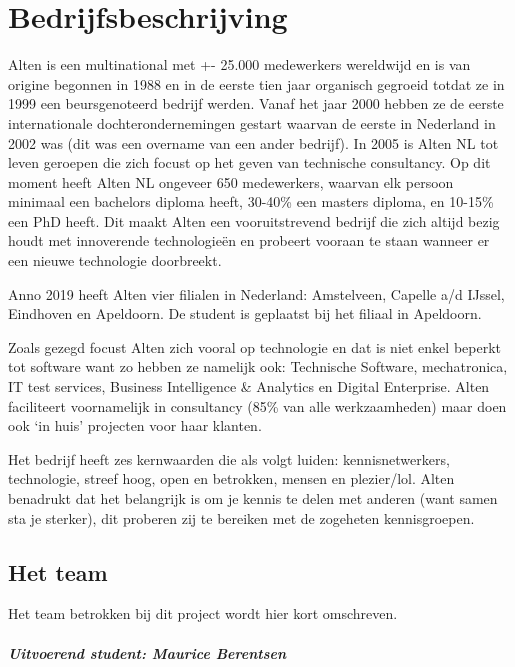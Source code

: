 \documentclass[a4paper, 11pt, oneside]{report}
\begin{document}
\chapter{Bedrijfsbeschrijving}\label{sec:bedrijfsbeschrijving}

Alten is een multinational met +- 25.000 medewerkers wereldwijd en is van origine begonnen in 1988 en in de eerste tien jaar organisch gegroeid totdat ze in 1999 een beursgenoteerd bedrijf werden.
Vanaf het jaar 2000 hebben ze de eerste internationale dochterondernemingen gestart waarvan de eerste in Nederland in 2002 was (dit was een overname van een ander bedrijf).
In 2005 is Alten NL tot leven geroepen die zich focust op het geven van technische consultancy.
Op dit moment heeft Alten NL ongeveer 650 medewerkers, waarvan elk persoon minimaal een bachelors diploma heeft, 30-40\% een masters diploma, en 10-15\% een PhD heeft.
Dit maakt Alten een vooruitstrevend bedrijf die zich altijd bezig houdt met innoverende technologieën en probeert vooraan te staan wanneer er een nieuwe technologie doorbreekt.

Anno 2019 heeft Alten vier filialen in Nederland: Amstelveen, Capelle a/d IJssel, Eindhoven en Apeldoorn.
De student is geplaatst bij het filiaal in Apeldoorn.

Zoals gezegd focust Alten zich vooral op technologie en dat is niet enkel beperkt tot software want zo hebben ze namelijk ook: Technische Software, mechatronica, IT test services, Business Intelligence \& Analytics en Digital Enterprise.
Alten faciliteert voornamelijk in consultancy (85\% van alle werkzaamheden) maar doen ook ‘in huis’ projecten voor haar klanten.

Het bedrijf heeft zes kernwaarden die als volgt luiden: kennisnetwerkers, technologie, streef hoog, open en betrokken, mensen en plezier/lol.
Alten benadrukt dat het belangrijk is om je kennis te delen met anderen (want samen sta je sterker), dit proberen zij te bereiken met de zogeheten kennisgroepen. 

\section{Het team}\label{sec:het-team}
Het team betrokken bij dit project wordt hier kort omschreven.

\paragraph{Uitvoerend student: Maurice Berentsen}
\end{document}
